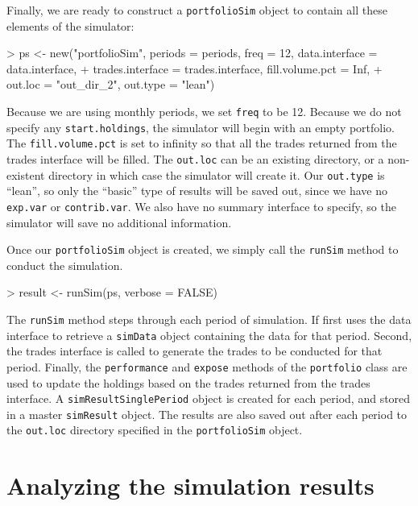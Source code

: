 \documentclass{article}
\begin{document}
Finally, we are ready to construct a \texttt{portfolioSim} object to
contain all these elements of the simulator:

\begin{Schunk}
\begin{Sinput}
> ps <- new("portfolioSim", periods = periods, freq = 12, data.interface = data.interface, 
+     trades.interface = trades.interface, fill.volume.pct = Inf, 
+     out.loc = "out_dir_2", out.type = "lean")
\end{Sinput}
\end{Schunk}

Because we are using monthly periods, we set \texttt{freq} to be 12.
Because we do not specify any \texttt{start.holdings}, the simulator
will begin with an empty portfolio.  The \texttt{fill.volume.pct} is
set to infinity so that all the trades returned from the trades
interface will be filled.  The \texttt{out.loc} can be an existing
directory, or a non-existent directory in which case the simulator
will create it.  Our \texttt{out.type} is ``lean'', so only the
``basic'' type of results will be saved out, since we have no
\texttt{exp.var} or \texttt{contrib.var}.  We also have no summary
interface to specify, so the simulator will save no additional
information.

Once our \texttt{portfolioSim} object is created, we simply call the
\texttt{runSim} method to conduct the simulation.

\begin{Schunk}
\begin{Sinput}
> result <- runSim(ps, verbose = FALSE)
\end{Sinput}
\end{Schunk}

The \texttt{runSim} method steps through each period of simulation.
If first uses the data interface to retrieve a \texttt{simData} object
containing the data for that period.  Second, the trades interface is
called to generate the trades to be conducted for that period.
Finally, the \texttt{performance} and \texttt{expose} methods of the
\texttt{portfolio} class are used to update the holdings based on the
trades returned from the trades interface.  A
\texttt{simResultSinglePeriod} object is created for each period, and
stored in a master \texttt{simResult} object.  The results are also
saved out after each period to the \texttt{out.loc} directory
specified in the \texttt{portfolioSim} object.

\section{Analyzing the simulation results}
\end{document}
